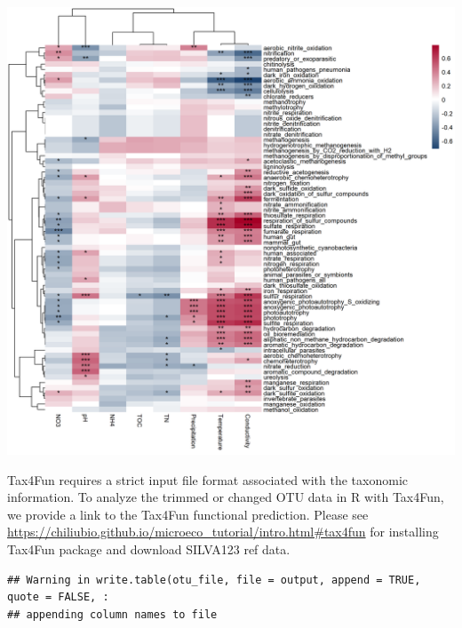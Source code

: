 \documentclass[
]{book}
\newenvironment{Shaded}{\begin{snugshade}}{\end{snugshade}}
\newcommand{\AttributeTok}[1]{\textcolor[rgb]{0.77,0.63,0.00}{#1}}
\newcommand{\CommentTok}[1]{\textcolor[rgb]{0.56,0.35,0.01}{\textit{#1}}}
\newcommand{\FunctionTok}[1]{\textcolor[rgb]{0.00,0.00,0.00}{#1}}
\newcommand{\NormalTok}[1]{#1}
\newcommand{\OtherTok}[1]{\textcolor[rgb]{0.56,0.35,0.01}{#1}}
\newcommand{\SpecialCharTok}[1]{\textcolor[rgb]{0.00,0.00,0.00}{#1}}
\newcommand{\StringTok}[1]{\textcolor[rgb]{0.31,0.60,0.02}{#1}}
\begin{document}
\begin{center}\includegraphics[width=800px]{Images/plot_func_perc_corr} \end{center}

Tax4Fun requires a strict input file format associated with the taxonomic information.
To analyze the trimmed or changed OTU data in R with Tax4Fun, we provide a link to the Tax4Fun functional prediction.
Please see \url{https://chiliubio.github.io/microeco_tutorial/intro.html\#tax4fun} for installing Tax4Fun package and download SILVA123 ref data.

\begin{Shaded}
\end{Shaded}

\begin{verbatim}
## Warning in write.table(otu_file, file = output, append = TRUE, quote = FALSE, :
## appending column names to file
\end{verbatim}
\end{document}
